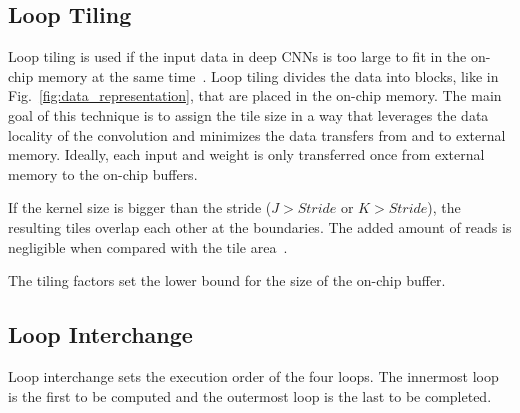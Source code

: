 %
%
%
%

\subsection{Loop Tiling}
\label{sec:loop_tiling}
Loop tiling is used if the input data in deep CNNs is too large to fit in the on-chip
memory at the same time~\cite{hal:accelCNNonFPGA}. Loop tiling divides the data into blocks, like in
Fig.~\ref{fig:data_representation}, that are placed in the on-chip memory. The
main goal of this technique is to assign the tile size in a way that leverages
the data locality of the convolution and minimizes the data transfers from and
to external memory. Ideally, each input and weight is only transferred once from
external memory to the on-chip buffers.

If the kernel size is bigger than the stride ($J>Stride\text{ or }K>Stride$),
the resulting tiles overlap each other at the boundaries. The added amount of
reads is negligible when compared with the tile area~\cite{Ma:80_OptDataflow_in_CNN}.

The tiling factors set the lower bound for the size of the on-chip buffer.

\subsection{Loop Interchange}
\label{sec:loop_interchange}
Loop interchange sets the execution order of the four loops. The innermost loop
is the first to be computed and the outermost loop is the last to be completed.

